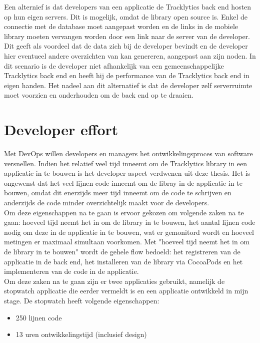 Een alternief is dat developers van een applicatie de Tracklytics back end hosten op hun eigen servers. Dit is mogelijk, omdat de library open source is. Enkel de connectie met de database moet aangepast worden en de links in de mobiele library moeten vervangen worden door een link naar de server van de developer. Dit geeft als voordeel dat de data zich bij de developer bevindt en de developer hier eventueel andere overzichten van kan genereren, aangepast aan zijn noden. In dit scenario is de developer niet afhankelijk van een gemeenschappelijke Tracklytics back end en heeft hij de performance van de Tracklytics back end in eigen handen. Het nadeel aan dit alternatief is dat de developer zelf serverruimte moet voorzien en onderhouden om de back end op te draaien. \\


\section{Developer effort}\label{Section:Effort}
Met DevOps willen developers en managers het ontwikkelingsproces van software versnellen. Indien het relatief veel tijd inneemt om de Tracklytics library in een applicatie in te bouwen is het developer aspect verdwenen uit deze thesis. Het is ongewenst dat het veel lijnen code inneemt om de libray in de applicatie in te bouwen, omdat dit enerzijds meer tijd inneemt om de code te schrijven en anderzijds de code minder overzichtelijk maakt voor de developers. \\

Om deze eigenschappen na te gaan is ervoor gekozen om volgende zaken na te gaan: hoeveel tijd neemt het in om de library in te bouwen, het aantal lijnen code nodig om deze in de applicatie in te bouwen, wat er gemonitord wordt en hoeveel metingen er maximaal simultaan voorkomen. Met "hoeveel tijd neemt het in om de library in te bouwen"  wordt de gehele flow bedoeld: het registreren van de applicatie in de back end, het installeren van de library via CocoaPods en het implementeren van de code in de applicatie. \\

Om deze zaken na te gaan zijn er twee applicaties gebruikt, namelijk de stopwatch applicatie die eerder vermeldt is en een applicatie ontwikkeld in mijn stage. De stopwatch heeft volgende eigenschappen:
\begin{itemize}
\item 250 lijnen code
\item 13 uren ontwikkelingstijd (inclusief design)
\end{itemize} 

